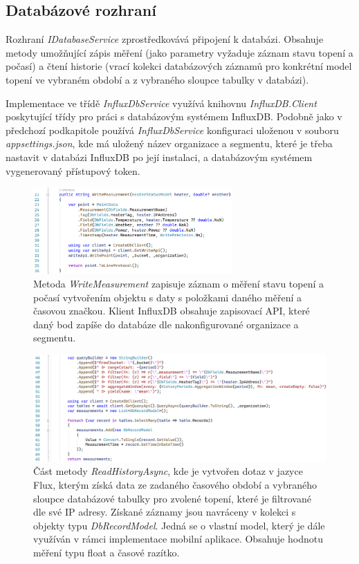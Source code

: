 \pagebreak

\subsection{Databázové rozhraní}
Rozhraní {\it IDatabaseService} zprostředkovává připojení k databázi. Obsahuje metody umožňující zápis měření (jako parametry vyžaduje záznam stavu topení a počasí) a čtení historie (vrací kolekci databázových záznamů pro konkrétní model topení ve vybraném období a z vybraného sloupce tabulky v databázi).

Implementace ve třídě {\it InfluxDbService} využívá knihovnu {\it InfluxDB.Client} poskytující třídy pro práci s databázovým systémem InfluxDB. Podobně jako v předchozí podkapitole používá {\it InfluxDbService} konfiguraci uloženou v souboru {\it appsettings.json}, kde má uložený název organizace a segmentu, které je třeba nastavit v databázi InfluxDB po její instalaci, a databázovým systémem vygenerovaný přístupový token.

\begin{figure}[hbt]
\includegraphics[width=0.68\textwidth]{obrazky-figures/code-influx-write.png}
\caption{Metoda {\it WriteMeasurement} zapisuje záznam o měření stavu topení a počasí vytvořením objektu s daty s položkami daného měření a časovou značkou. Klient InfluxDB obsahuje zapisovací API, které daný bod zapíše do databáze dle nakonfigurované organizace a segmentu.}
\end{figure}

\begin{figure}[hbt]
\includegraphics[width=1.05\textwidth]{obrazky-figures/code-influx-read.png}
\caption{Část metody {\it ReadHistoryAsync}, kde je vytvořen dotaz v jazyce Flux, kterým získá data ze zadaného časového období a vybraného sloupce databázové tabulky pro zvolené topení, které je filtrované dle své IP adresy. Získané záznamy jsou navráceny v kolekci s objekty typu {\it DbRecordModel}. Jedná se o vlastní model, který je dále využíván v rámci implementace mobilní aplikace. Obsahuje hodnotu měření typu float a časové razítko.}
\end{figure}

